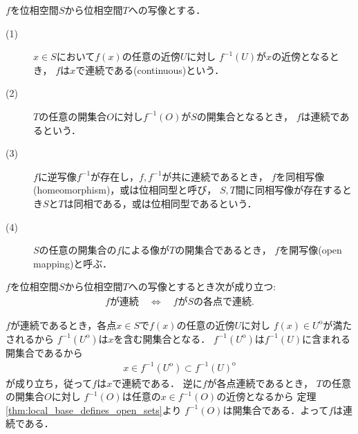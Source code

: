 	\begin{screen}
		\begin{dfn}[連続・同相・開写像]
			$f$を位相空間$S$から位相空間$T$への写像とする．
			\begin{description}
				\item[(1)]
					$x \in S$において$f(x)$の任意の近傍$U$に対し
					$f^{-1}(U)$が$x$の近傍となるとき，
					$f$は$x$で連続である(continuous)という．
					
				\item[(2)] $T$の任意の開集合$O$に対し$f^{-1}(O)$が$S$の開集合となるとき，
					$f$は連続であるという．
					
				\item[(3)] $f$に逆写像$f^{-1}$が存在し，$f,f^{-1}$が共に連続であるとき，
					$f$を同相写像(homeomorphism)，或は位相同型と呼び，
					$S,T$間に同相写像が存在するとき$S$と$T$は同相である，或は位相同型であるという．
					
				\item[(4)] $S$の任意の開集合の$f$による像が$T$の開集合であるとき，
					$f$を開写像(open mapping)と呼ぶ．
			\end{description}
		\end{dfn}
	\end{screen}
	
	\begin{screen}
		\begin{thm}
			$f$を位相空間$S$から位相空間$T$への写像とするとき次が成り立つ:
			\begin{align}
				\mbox{$f$が連続} \quad \Longleftrightarrow \quad
				\mbox{$f$が$S$の各点で連続}.
			\end{align}
		\end{thm}
	\end{screen}
	
	\begin{prf}
		$f$が連続であるとき，各点$x \in S$で$f(x)$の任意の近傍$U$に対し
		$f(x) \in U^{\mathrm{o}}$が満たされるから
		$f^{-1}(U^{\mathrm{o}})$は$x$を含む開集合となる．
		$f^{-1}(U^{\mathrm{o}})$は$f^{-1}(U)$に含まれる開集合であるから
		\begin{align}
			x \in f^{-1}(U^{\mathrm{o}}) \subset f^{-1}(U)^{\mathrm{o}}
		\end{align}
		が成り立ち，従って$f$は$x$で連続である．
		逆に$f$が各点連続であるとき，
		$T$の任意の開集合$O$に対し
		$f^{-1}(O)$は任意の$x \in f^{-1}(O)$の近傍となるから
		定理\ref{thm:local_base_defines_open_sets}より
		$f^{-1}(O)$は開集合である．よって$f$は連続である．
		\QED
	\end{prf}
	
